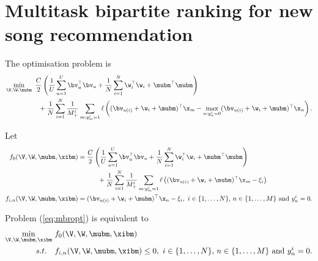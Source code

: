 \section{Multitask bipartite ranking for new song recommendation}

The optimisation problem is
\begin{equation}
\label{eq:mbropt}
\begin{aligned}
&\min_{\V, \W, \mubm} \ \frac{C}{2} \left( \frac{1}{U} \sum_{u=1}^U \bv_u^\top \bv_u 
     + \frac{1}{N} \sum_{i=1}^N \w_i^\top \w_i + \mubm^\top \mubm \right) \\
& \hspace{5em}
     + \frac{1}{N} \sum_{i=1}^N \frac{1}{M_+^i} \sum_{m: y_m^i = 1} \ell \left( (\bv_{u(i)} + \w_i + \mubm)^\top \x_m 
     - \max_{n: y_n^i = 0} (\bv_{u(i)} + \w_i + \mubm)^\top \x_n \right).
\end{aligned}
\end{equation}

Let 
\begin{equation*}
\begin{aligned}
f_0(\V, \W, \mubm, \xibm) &= \frac{C}{2} \left( \frac{1}{U} \sum_{u=1}^U \bv_u^\top \bv_u 
     + \frac{1}{N} \sum_{i=1}^N \w_i^\top \w_i + \mubm^\top \mubm \right) \\
& \hspace{3em}
     + \frac{1}{N} \sum_{i=1}^N \frac{1}{M_+^i} \sum_{m: y_m^i = 1} 
       \ell \left( (\bv_{u(i)} + \w_i + \mubm)^\top \x_m - \xi_i \right) \\
f_{i,n} (\V, \W, \mubm, \xibm) &= (\bv_{u(i)} + \w_i + \mubm)^\top \x_n - \xi_i, \
i \in \{1,\dots,N\}, \, n \in \{1,\dots,M\} \ \mathrm{and} \ y_n^i = 0.
\end{aligned}
\end{equation*}

Problem (\ref{eq:mbropt}) is equivalent to 
\begin{equation}
\label{eq:stdopt}
\begin{aligned}
\min_{\V, \W, \mubm, \xibm} \ & f_0(\V, \W, \mubm, \xibm) \\
s.t. \quad & f_{i,n}(\V, \W, \mubm, \xibm) \le 0, \
i \in \{1,\dots,N\}, \, n \in \{1,\dots,M\} \ \mathrm{and} \ y_n^i = 0.
\end{aligned}
\end{equation}

